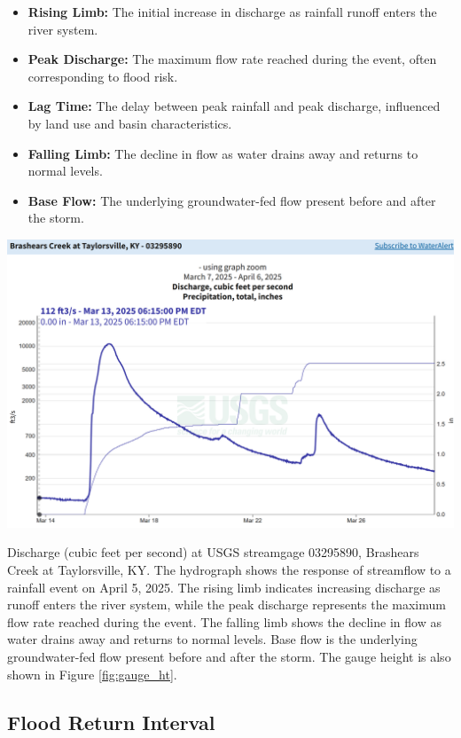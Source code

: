 \documentclass{tufte-handout}\usepackage[]{graphicx}\usepackage[]{xcolor}
\begin{document}
\begin{itemize}
  \item \textbf{Rising Limb:} The initial increase in discharge as rainfall runoff enters the river system.
  \item \textbf{Peak Discharge:} The maximum flow rate reached during the event, often corresponding to flood risk.
  \item \textbf{Lag Time:} The delay between peak rainfall and peak discharge, influenced by land use and basin characteristics.
  \item \textbf{Falling Limb:} The decline in flow as water drains away and returns to normal levels.
  \item \textbf{Base Flow:} The underlying groundwater-fed flow present before and after the storm.
\end{itemize}

\begin{marginfigure}
	\centering
		\includegraphics[width=1.00\textwidth]{figure/Discharge.png}
		\caption{Discharge (cubic feet per second) at USGS streamgage 03295890, Brashears Creek at Taylorsville, KY. The hydrograph shows the response of streamflow to a rainfall event on April 5, 2025. The rising limb indicates increasing discharge as runoff enters the river system, while the peak discharge represents the maximum flow rate reached during the event. The falling limb shows the decline in flow as water drains away and returns to normal levels. Base flow is the underlying groundwater-fed flow present before and after the storm. The gauge height is also shown in Figure \ref{fig:gauge_ht}.}
	\label{fig:discharge}
\end{marginfigure}


\subsection{Flood Return Interval}
\end{document}

